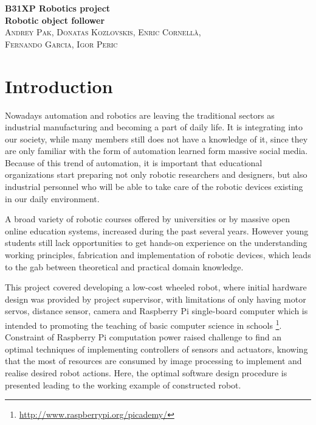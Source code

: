 \documentclass[11pt]{article}
\begin{document}
   \begin{center}
     {\huge\bfseries B31XP Robotics project\\ Robotic object follower}\\
      \vspace{2ex}
      \textsc{Andrey Pak, Donatas Kozlovskis, Enric Cornellà,\\ Fernando Garcia,  Igor Peric}
   \end{center}
   \vspace{2ex}%

\begin{abstract}
This project presents a small, easy to build low-cost robot system, that is able to find coloured signs on the floor and implement the associated actions, e.g. stop, turn, pause, etc.
The robot hardware uses Raspberry Pi to control a set of motors, sensors and servo actuators. 
Report provides information about done review the hardware design and implementation of software using open source tools as C++ and OpenCV libraries. 
\end{abstract}

\section{Introduction}


Nowadays automation and robotics are leaving the traditional sectors as industrial manufacturing and becoming a part of daily life. It is integrating into our society, while many members still does not have a knowledge of it, since they are only familiar with the form of automation learned form massive social media.
Because of this trend of automation, it is important that educational organizations start preparing not only robotic researchers and designers, but also industrial personnel who will be able
to take care of the robotic devices existing in our daily environment. 

A broad variety of robotic courses offered by universities or by massive open online education systems, increased during the past several years. However young students still lack opportunities to get hands-on experience on the understanding working principles, fabrication and implementation of robotic devices, which leads to the gab between theoretical and practical domain knowledge.

This project covered developing a low-cost wheeled robot, where initial hardware design was provided by project supervisor, with limitations of only having motor servos, distance sensor, camera and Raspberry Pi single-board computer which is intended to promoting the teaching of basic computer science in schools \footnote{\url{http://www.raspberrypi.org/picademy/}}.
Constraint of  Raspberry Pi computation power raised challenge to find an  optimal techniques of implementing controllers of sensors and actuators, knowing that the most of resources are consumed by image processing to implement and realise desired robot actions. Here, the optimal software design procedure is presented leading to the working example of constructed robot.
\end{document}
